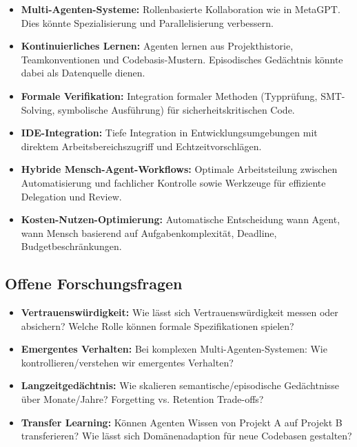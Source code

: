 \begin{itemize}
  \item \textbf{Multi-Agenten-Systeme:} Rollenbasierte Kollaboration wie in MetaGPT. Dies könnte Spezialisierung und Parallelisierung verbessern.
  
  \item \textbf{Kontinuierliches Lernen:} Agenten lernen aus Projekthistorie, Teamkonventionen und Codebasis-Mustern. Episodisches Gedächtnis könnte dabei als Datenquelle dienen.
  
  \item \textbf{Formale Verifikation:} Integration formaler Methoden (Typprüfung, SMT-Solving, symbolische Ausführung) für sicherheitskritischen Code.
  
  \item \textbf{IDE-Integration:} Tiefe Integration in Entwicklungsumgebungen mit direktem Arbeitsbereichszugriff und Echtzeitvorschlägen.
  
  \item \textbf{Hybride Mensch-Agent-Workflows:} Optimale Arbeitsteilung zwischen Automatisierung und fachlicher Kontrolle sowie Werkzeuge für effiziente Delegation und Review.
  
  \item \textbf{Kosten-Nutzen-Optimierung:} Automatische Entscheidung wann Agent, wann Mensch basierend auf Aufgabenkomplexität, Deadline, Budgetbeschränkungen.
\end{itemize}

\subsection{Offene Forschungsfragen}

\begin{itemize}
  \item \textbf{Vertrauenswürdigkeit:} Wie lässt sich Vertrauenswürdigkeit messen oder absichern? Welche Rolle können formale Spezifikationen spielen?
  
  \item \textbf{Emergentes Verhalten:} Bei komplexen Multi-Agenten-Systemen: Wie kontrollieren/verstehen wir emergentes Verhalten?
  
  \item \textbf{Langzeitgedächtnis:} Wie skalieren semantische/episodische Gedächtnisse über Monate/Jahre? Forgetting vs. Retention Trade-offs?
  
  \item \textbf{Transfer Learning:} Können Agenten Wissen von Projekt A auf Projekt B transferieren? Wie lässt sich Domänenadaption für neue Codebasen gestalten?
\end{itemize}

